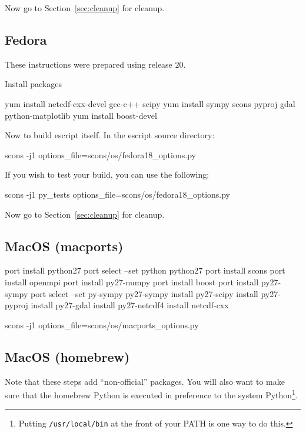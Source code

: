\noindent Now go to Section~\ref{sec:cleanup} for cleanup.

\subsection{Fedora}\label{sec:fedorasrc}
These instructions were prepared using release $20$.

\noindent Install packages
\begin{shellCode}
yum install netcdf-cxx-devel gcc-c++ scipy 
yum install sympy scons pyproj gdal python-matplotlib 
yum install boost-devel
\end{shellCode}

\noindent Now to build escript itself.
In the escript source directory:
\begin{shellCode}
scons -j1 options_file=scons/os/fedora18_options.py
\end{shellCode}

\noindent If you wish to test your build, you can use the following:
\begin{shellCode}
scons -j1 py_tests options_file=scons/os/fedora18_options.py 
\end{shellCode}

\noindent Now go to Section~\ref{sec:cleanup} for cleanup.

\subsection{MacOS (macports)}\label{sec:macportsrc}

\begin{shellCode}
port install python27
port select --set python python27
port install scons
port install openmpi
port install py27-numpy
port install boost
port install py27-sympy
port select --set py-sympy py27-sympy
install py27-scipy
install py27-pyproj
install py27-gdal
install py27-netcdf4
install netcdf-cxx
\end{shellCode}

\begin{shellCode}
scons -j1 options_file=scons/os/macports_options.py 
\end{shellCode}


\subsection{MacOS (homebrew)}\label{sec:homebrewsrc}

Note that these steps add ``non-official'' packages.
You will also want to make sure that the homebrew Python is executed in preference to the system 
Python\footnote{Putting \texttt{/usr/local/bin} at the front of your PATH is one way to do this.}.

